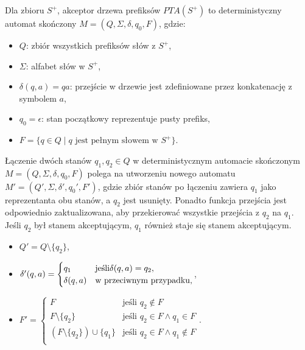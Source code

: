 \begin{definition}  
    \label{def:pta}
    Dla zbioru \( S^+ \), akceptor drzewa prefiksów \( PTA(S^+) \) to deterministyczny automat skończony \( M = (Q, \Sigma, \delta, q_0, F) \), gdzie:
    \begin{itemize}
        \item \( Q \): zbiór wszystkich prefiksów słów z \( S^+ \),
        \item \( \Sigma \): alfabet słów w \( S^+ \),
        \item \( \delta(q, a) = qa \): przejście w drzewie jest zdefiniowane przez konkatenację z symbolem \( a \),
        \item \( q_0 = \epsilon \): stan początkowy reprezentuje pusty prefiks,
        \item \( F = \{q \in Q \mid q \text{ jest pełnym słowem w } S^+\}\).
    \end{itemize}
\end{definition}

\begin{definition}
    \label{def:state_merging}
    Łączenie dwóch stanów \( q_1, q_2 \in Q \) w deterministycznym automacie skończonym \( M = (Q, \Sigma, \delta, q_0, F) \) polega na utworzeniu nowego automatu \( M' = (Q', \Sigma, \delta', q_0', F') \), gdzie zbiór stanów po łączeniu zawiera \( q_1 \) jako reprezentanta obu stanów, a \( q_2 \) jest usunięty. Ponadto funkcja przejścia jest odpowiednio zaktualizowana, aby przekierować wszystkie przejścia z \( q_2 \) na \( q_1 \). Jeśli \( q_2 \) był stanem akceptującym, \( q_1 \) również staje się stanem akceptującym.
    \begin{itemize}
        \item \( Q' = Q \setminus \{q_2\} \),
        \item \( \delta'(q, a) = 
        \begin{cases} 
            q_1 & \text{jeśli} \space \delta(q, a) = q_2, \\
            \delta(q, a) & \text{w przeciwnym przypadku,}
        \end{cases}
        \),
        \item \( F' =
        \begin{cases} 
            F & \text{jeśli } q_2 \notin F \\
            F \setminus \{q_2\} & \text{jeśli } q_2 \in F \land q_1 \in F \\
            (F \setminus \{q_2\}) \cup \{q_1\} & \text{jeśli } q_2 \in F \land q_1 \notin F \\
        \end{cases}
        \).
    \end{itemize}
\end{definition}

